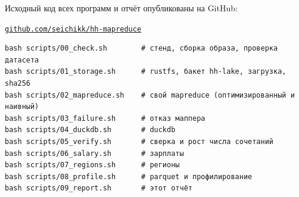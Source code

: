 \documentclass[11pt,a4paper]{article}
\newcommand{\repoUrl}{\texttt{github.com/seichikk/hh-mapreduce}}
\begin{document}
Исходный код всех программ и отчёт опубликованы на GitHub:
\begin{center}\href{https://github.com/seichikk/hh-mapreduce}{\repoUrl}\end{center}

\begin{Verbatim}[fontsize=\small,frame=single]
bash scripts/00_check.sh        # стенд, сборка образа, проверка датасета
bash scripts/01_storage.sh      # rustfs, бакет hh-lake, загрузка, sha256
bash scripts/02_mapreduce.sh    # свой mapreduce (оптимизированный и наивный)
bash scripts/03_failure.sh      # отказ маппера
bash scripts/04_duckdb.sh       # duckdb
bash scripts/05_verify.sh       # сверка и рост числа сочетаний
bash scripts/06_salary.sh       # зарплаты
bash scripts/07_regions.sh      # регионы
bash scripts/08_profile.sh      # parquet и профилирование
bash scripts/09_report.sh       # этот отчёт
\end{Verbatim}
\end{document}
